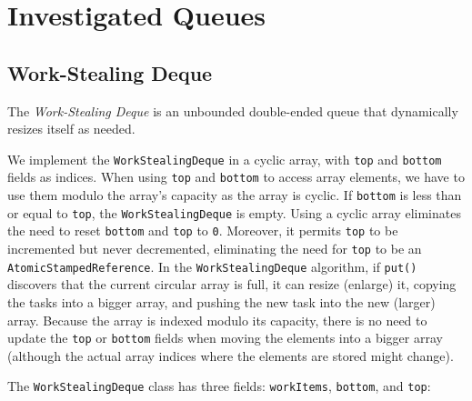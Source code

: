 
\chapter{Investigated Queues}
\label{chap:queues-implementation}

\section{Work-Stealing Deque}
\label{sec:queues-implementation-ws-deque}

The \emph{Work-Stealing Deque} is an unbounded double-ended queue that
dynamically resizes itself as needed.

We implement the \lstinline!WorkStealingDeque! in a cyclic array, with
\lstinline!top! and \lstinline!bottom! fields as indices. When using
\lstinline!top! and \lstinline!bottom! to access array elements, we
have to use them modulo the array's capacity as the array is
cyclic. If \lstinline!bottom! is less than or equal to
\lstinline!top!, the \lstinline!WorkStealingDeque! is empty. Using a
cyclic array eliminates the need to reset \lstinline!bottom! and
\lstinline!top! to \lstinline!0!. Moreover, it permits \lstinline!top!
to be incremented but never decremented, eliminating the need for
\lstinline!top! to be an \lstinline!AtomicStampedReference!. In the
\lstinline!WorkStealingDeque! algorithm, if \lstinline!put()!
discovers that the current circular array is full, it can resize
(enlarge) it, copying the tasks into a bigger array, and pushing the
new task into the new (larger) array. Because the array is indexed
modulo its capacity, there is no need to update the \lstinline!top! or
\lstinline!bottom! fields when moving the elements into a bigger array
(although the actual array indices where the elements are stored might
change).

The \lstinline!WorkStealingDeque! class has three fields:
\lstinline!workItems!, \lstinline!bottom!, and \lstinline!top!:



